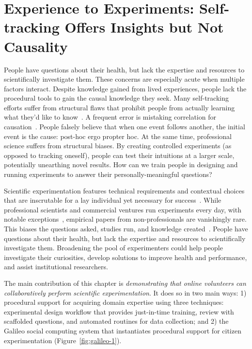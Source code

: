 \section{Experience to Experiments: Self-tracking Offers Insights but Not Causality}
People have questions about their health, but lack the expertise and resources to scientifically
investigate them. These concerns are especially acute when multiple factors interact. Despite
knowledge gained from lived experiences, people lack the procedural tools to gain the causal
knowledge they seek. Many self-tracking efforts suffer from structural flaws that prohibit people
from actually learning what they'd like to know~\cite{Choe2014, Li2010a}. A frequent error is mistaking correlation
for causation~\cite{Munroe2009}. People falsely believe that when one event follows another, the initial event is
the cause: post-hoc ergo propter hoc. At the same time, professional science suffers from structural
biases. By creating controlled experiments (as opposed to tracking oneself), people can test their
intuitions at a larger scale, potentially unearthing novel results. How can we train people in designing
and running experiments to answer their personally-meaningful questions?

Scientific experimentation features technical requirements and contextual choices that are inscrutable for a lay individual yet necessary for success~\cite{Martin2007}. While professional scientists and commercial ventures run experiments every day, with notable exceptions~\cite{Cooper2010, Lewis2016}, empirical papers from non-professionals are vanishingly rare. This biases the questions asked, studies run, and knowledge created~\cite{crawford2017politics,Henrich2010a}. People have questions about their health, but lack the expertise and resources to scientifically investigate them. Broadening the pool of experimenters could help people investigate their curiosities, develop solutions to improve health and performance, and assist institutional researchers.

The main contribution of this chapter is \textit {demonstrating that online volunteers can collaboratively perform scientific experimentation}. It does so in two main ways: 1) procedural support for acquiring domain expertise using three techniques: experimental design workflow that provides just-in-time training, review with scaffolded questions, and automated routines for data collection; and 2) the Galileo social computing system that instantiates procedural support for citizen experimentation (Figure~\ref{fig:galileo-1}). 

